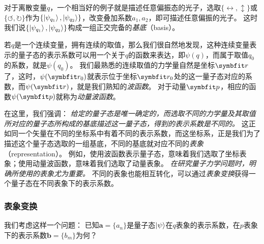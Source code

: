 对于离散变量$q$，一个相当好的例子就是描述任意偏振态的光子，选取$\{\leftrightarrow,\updownarrow\}$或$\{\circlearrowleft,\circlearrowright\}$作为$\{\ket{\psi_{q_1}}, \ket{\psi_{q_2}}\}$，改变叠加系数$a_1, a_2$，即可描述任意偏振的光子。
这时我们说$\{\ket{\psi_{q_1}}, \ket{\psi_{q_2}}\}$构成一组正交完备的\emph{基底}（basis）。

若$q$是一个连续变量，拥有连续的取值，那么我们很自然地发现，这种连续变量表示的量子态的表示系数可以用一个关于$q$的函数来表达，即$\psi(q)$，而属于取值$q_0$的系数，就是$\psi(q_0)$。
我们最熟悉的连续取值的力学量自然是坐标$\rr$了，这时，$\psi(\rr_0)$就表示位于坐标$\rr_0$处的这一量子态对应的系数，而$\psi(\rr)$，就是我们熟知的\emph{波函数}。
对于动量$\pp$，相应的函数$\psi(\pp)$就称为\emph{动量波函数}。

在这里，我们强调：
\emph{给定的量子态是唯一确定的，而选取不同的力学量及其取值所对应的量子态所构成的基底描述这一量子态，得到的表示系数是不同的。}
这正如同一个矢量在不同的坐标系中有着不同的表示系数，而这坐标系，正是我们为了描述这个量子态选取的一组基底，不同的基底就对应不同的\emph{表象}（representation）。
例如，使用波函数表示量子态，意味着我们选取了坐标表象；使用动量波函数，意味着我们选取了动量表象。
\emph{在研究量子力学问题时，明确所使用的表象尤为重要。}
不同的表象也能相互转化，可以通过\emph{表象变换}获得一个量子态在不同表象下的表示系数。


\subsubsection{表象变换}

我们考虑这样一个问题：
已知$\bm{a}=\{a_n\}$是量子态$\ket{\psi}$在$q$表象的表示系数，在$p$表象下的表示系数$\bm{b}=\{b_m\}$为何？

